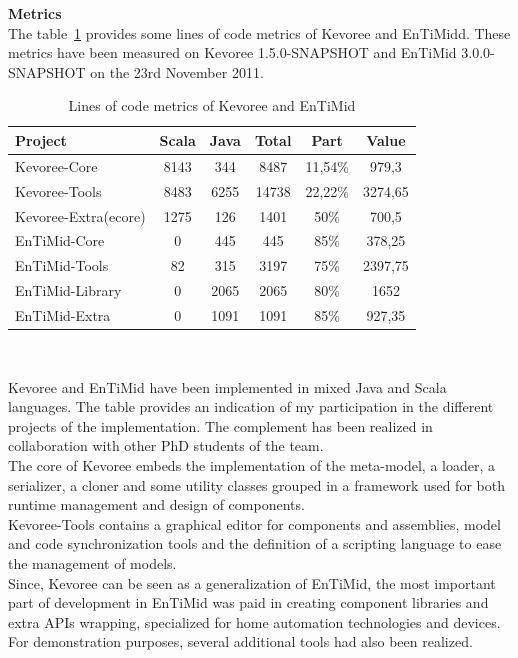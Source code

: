 {\bf Metrics}\\
The table~\ref{table:metrics} provides some lines of code metrics of Kevoree and EnTiMidd. These metrics have been measured on Kevoree 1.5.0-SNAPSHOT and EnTiMid 3.0.0-SNAPSHOT on the 23rd November 2011.\\
\begin{table}
\centering
\begin{tabular}{l||c|c|c|c|c}
Project & Scala & Java & Total & Part & Value \\
\hline \hline
Kevoree-Core & 8143 & 344 & 8487 & 11,54\% & 979,3 \\
Kevoree-Tools & 8483 & 6255 & 14738 & 22,22\% & 3274,65 \\
Kevoree-Extra(ecore) & 1275 & 126 & 1401 & 50\% & 700,5 \\
\hline \hline
EnTiMid-Core & 0 & 445 & 445 & 85\% & 378,25 \\
EnTiMid-Tools & 82 & 315 & 3197 & 75\% & 2397,75 \\
EnTiMid-Library & 0 & 2065 & 2065 & 80\% & 1652 \\
EnTiMid-Extra & 0 & 1091 & 1091 & 85\% & 927,35 \\
\end{tabular}\\
\caption{Lines of code metrics of Kevoree and EnTiMid}
\label{table:metrics}
\end{table}
\vspace{-0.2cm}

Kevoree and EnTiMid have been implemented in mixed Java and Scala languages. The table provides an indication of my participation in the different projects of the implementation. The complement has been realized in collaboration with other PhD students of the team.\\
The core of Kevoree embeds the implementation of the meta-model, a loader, a serializer, a cloner and some utility classes grouped in a framework used for both runtime management and design of components.\\
Kevoree-Tools contains a graphical editor for components and assemblies, model and code synchronization tools and the definition of a scripting language to ease the management of models.\\

Since, Kevoree can be seen as a generalization of EnTiMid, the most important part of development in EnTiMid was paid in creating component libraries and extra APIs wrapping, specialized for home automation technologies and devices. For demonstration purposes, several additional tools had also been realized.

